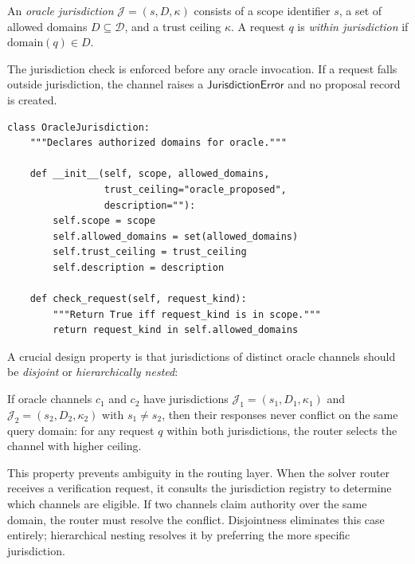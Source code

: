 \documentclass[11pt]{article}
\begin{document}
\begin{definition}\label{def:jurisdiction}
An \emph{oracle jurisdiction} $\mathcal{J} = (s, D, \kappa)$
consists of a scope identifier $s$, a set of allowed domains
$D \subseteq \mathcal{D}$, and a trust ceiling $\kappa$.  A
request $q$ is \emph{within jurisdiction} if
$\mathrm{domain}(q) \in D$.
\end{definition}

The jurisdiction check is enforced before any oracle invocation.
If a request falls outside jurisdiction, the channel raises a
$\mathsf{JurisdictionError}$ and no proposal record is created.

\begin{lstlisting}[style=jugeo-python,caption={OracleJurisdiction class.}]
class OracleJurisdiction:
    """Declares authorized domains for oracle."""

    def __init__(self, scope, allowed_domains,
                 trust_ceiling="oracle_proposed",
                 description=""):
        self.scope = scope
        self.allowed_domains = set(allowed_domains)
        self.trust_ceiling = trust_ceiling
        self.description = description

    def check_request(self, request_kind):
        """Return True iff request_kind is in scope."""
        return request_kind in self.allowed_domains
\end{lstlisting}

A crucial design property is that jurisdictions of distinct oracle
channels should be \emph{disjoint} or \emph{hierarchically nested}:

\begin{proposition}\label{prop:disjoint}
If oracle channels $c_1$ and $c_2$ have jurisdictions
$\mathcal{J}_1 = (s_1, D_1, \kappa_1)$ and
$\mathcal{J}_2 = (s_2, D_2, \kappa_2)$ with $s_1 \ne s_2$,
then their responses never conflict on the same query domain:
for any request $q$ within both jurisdictions, the router
selects the channel with higher ceiling.
\end{proposition}

This property prevents ambiguity in the routing layer.  When the
solver router receives a verification request, it consults the
jurisdiction registry to determine which channels are eligible.  If
two channels claim authority over the same domain, the router must
resolve the conflict.  Disjointness eliminates this case entirely;
hierarchical nesting resolves it by preferring the more specific
jurisdiction.
\end{document}
